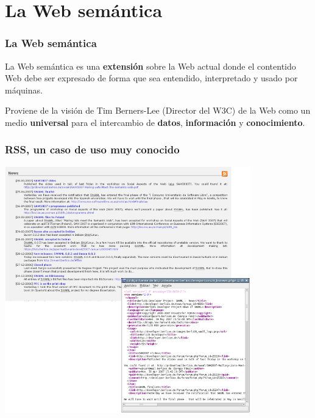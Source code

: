 \documentclass[spanish,notes=hide]{beamer}
\begin{document}
\section{La Web semántica}
\frame
{
  \frametitle{La Web semántica}

  \begin{Large}
    La Web semántica es una \textbf{extensión} sobre la Web actual donde el 
    contentido Web debe ser expresado de forma que sea entendido, interpretado 
    y usado por máquinas.
  \end{Large}
  
  \vspace{1cm}

  \begin{Large}
    Proviene de la visión de Tim Berners-Lee (Director del W3C) de la Web como un
    medio \textbf{universal} para el intercambio de \textbf{datos}, \textbf{información} 
    y \textbf{conocimiento}.
  \end{Large}
}
\frame
{
  \frametitle{RSS, un caso de uso muy conocido}

  \begin{center}
    \includegraphics[width=0.8\textwidth]{images/rss.png}
  \end{center}
}
\frame
\end{document}
